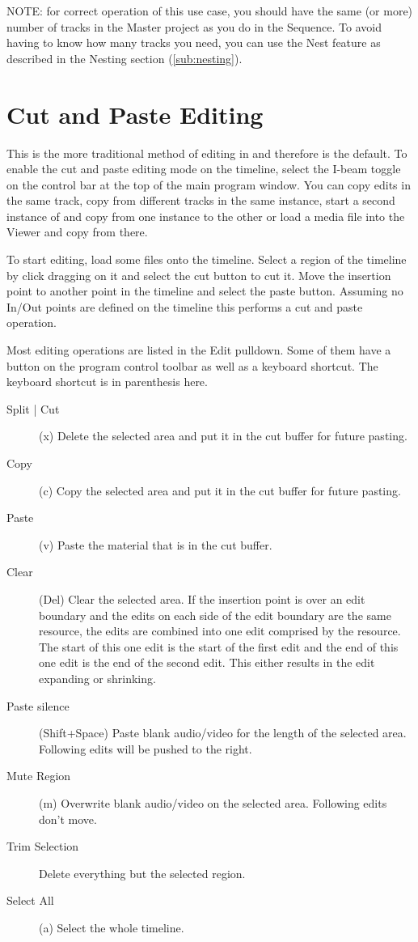 NOTE: for correct operation of this use case, you should have the
same (or more) number of tracks in the Master project as you do in
the Sequence.  To avoid having to know how many tracks you need, you
can use the Nest feature as described in the Nesting section
(\ref{sub:nesting}).


\section{Cut and Paste Editing}%
\label{sec:cut_paste_editing}

This is the more traditional method of editing in \CGG{} and
therefore is the default.  To enable the cut and paste editing mode
on the timeline, select the I-beam toggle on the control bar at the
top of the main program window. You can copy edits in the same
track, copy from different tracks in the same instance, start a
second instance of \CGG{} and copy from one instance to the other or
load a media file into the Viewer and copy from there.

To start editing, load some files onto the timeline.  Select a
region of the timeline by click dragging on it and select the cut
button to cut it. Move the insertion point to another point in the
timeline and select the paste button.  Assuming no In/Out points are
defined on the timeline this performs a cut and paste operation.

Most editing operations are listed in the Edit pulldown. Some of
them have a button on the program control toolbar as well as a
keyboard shortcut.  The keyboard shortcut is in parenthesis here.

\begin{description}
\item [Split | Cut] (x) Delete the selected area and put it in
  the cut buffer for future pasting.
\item[Copy] (c) Copy the selected area and put it in the cut
  buffer for future pasting.
\item[Paste] (v) Paste the material that is in the cut buffer.
\item[Clear] (Del) Clear the selected area. If the insertion
  point is over an edit boundary and the edits on each side of the
  edit boundary are the same resource, the edits are combined into one
  edit comprised by the resource. The start of this one edit is the
  start of the first edit and the end of this one edit is the end of
  the second edit. This either results in the edit expanding or
  shrinking.
\item[Paste silence] (Shift+Space) Paste blank audio/video for
  the length of the selected area. Following edits will be pushed to
  the right.
\item[Mute Region] (m) Overwrite blank audio/video on the
  selected area. Following edits don't move.
\item[Trim Selection] Delete everything but the selected region.
\item[Select All] (a) Select the whole timeline.
\end{description}


